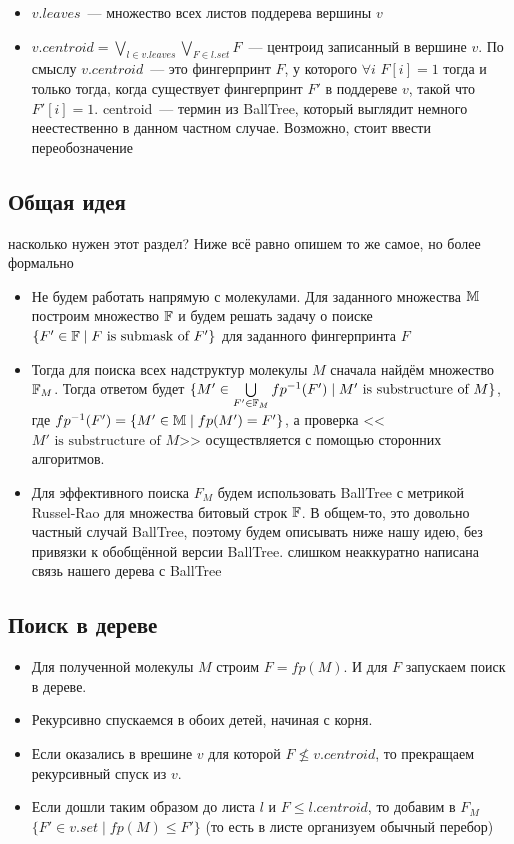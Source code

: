 \begin{itemize}
  \item $v.leaves$~--- множество всех листов поддерева вершины $v$
  \item $v.centroid = \bigvee\limits_{l \in v.leaves}\bigvee\limits_{F \in l.set} F$~--- центроид записанный в вершине $v$.
    По смыслу $v.centroid$~--- это фингерпринт $F$, у которого $\forall i $ $F[i] = 1$ тогда и только тогда, когда существует фингерпринт $F' $ в поддереве $v$, такой что $F'[i] = 1$. {\color{red} centroid~--- термин из BallTree, который выглядит немного неестественно в данном частном случае. Возможно, стоит ввести переобозначение}
\end{itemize}

\subsection{Общая идея}

{\color{red} насколько нужен этот раздел? Ниже всё равно опишем то же самое, но более формально}

\begin{itemize}
  \item Не будем работать напрямую с молекулами. Для заданного множества $\mathbb{M}$ построим множество $\mathbb{F}$ и будем решать задачу о поиске $\{F' \in \mathbb{F} \mid F \text{ is submask of } F'\}$ для заданного фингерпринта $F$ 
\item Тогда для поиска всех надструктур молекулы $M$ сначала найдём множество $\mathbb{F}_M$. Тогда ответом будет $\{ M' \in \bigcup\limits_{F' \in \mathbb{F}_M} fp^{-1}(F') \mid M' \text{ is substructure of } M\}$, где $fp^{-1}(F') = \{M' \in \mathbb{M} \mid fp(M') = F'\}$, а проверка <<$M' \text{ is substructure of } M$>> осуществляется с помощью сторонних алгоритмов.     
  \item Для эффективного поиска $F_M$ будем использовать BallTree с метрикой Russel-Rao для множества битовый строк $\mathbb{F}$. В общем-то, это довольно частный случай BallTree, поэтому будем описывать ниже нашу идею, без привязки к обобщённой версии BallTree. {\color{red} слишком неаккуратно написана связь нашего дерева с  BallTree}
\end{itemize} 

\subsection{Поиск в дереве}

\begin{itemize}
  \item Для полученной молекулы $M $ строим $F = fp(M)$. И для $F $ запускаем поиск в дереве.
  \item Рекурсивно спускаемся в обоих детей, начиная с корня.
  \item Если оказались в врешине $v $ для которой $F \not\le v.centroid$, то прекращаем рекурсивный спуск из $v$. 
  \item Если дошли таким образом до листа $l $ и $F \le l.centroid$, то  добавим в $F_M $ $\{F' \in v.set \mid fp(M) \le F'\}$ (то есть в листе организуем обычный перебор)
\end{itemize}

